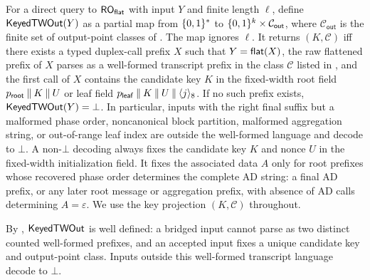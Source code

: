 \begin{definition}
\label{def:keyed-twout}
For a direct query to $\mathsf{RO}_{\mathsf{flat}}$ with input $Y$ and finite length
$\ell$, define $\mathsf{KeyedTWOut}(Y)$ as a partial map from $\{0,1\}^*$ to
$\{0,1\}^k \times \mathcal{C}_{\mathsf{out}}$, where $\mathcal{C}_{\mathsf{out}}$
is the finite set of output-point classes of . The map ignores
$\ell$. It returns $(K,\mathcal{C})$ iff
there exists a typed \TW{} duplex-call prefix $X$ such that
$Y = \mathsf{flat}(X)$, the raw flattened prefix of $X$ parses as a
well-formed \TW{} transcript prefix in the class $\mathcal{C}$ listed in
, and the first call of $X$ contains the
candidate key $K$ in the fixed-width root field
$p_{\mathsf{root}} \mathbin{\|} K \mathbin{\|} U$ or leaf field
$p_{\mathsf{leaf}} \mathbin{\|} K \mathbin{\|} U \mathbin{\|} \langle j \rangle_8$. If no
such prefix exists, $\mathsf{KeyedTWOut}(Y) = \bot$. In particular, inputs with
the right final suffix but a malformed phase order, noncanonical block
partition, malformed aggregation string, or out-of-range leaf index are
outside the well-formed language and decode to $\bot$. A non-$\bot$
decoding always fixes the candidate key $K$ and nonce $U$ in the
fixed-width initialization field. It fixes the associated data $A$ only
for root prefixes whose recovered phase order determines the complete AD
string: a final AD prefix, or any later root message or aggregation
prefix, with absence of AD calls determining $A=\varepsilon$. We use the
key projection $(K,\mathcal{C})$ throughout.
\end{definition}

By , $\mathsf{KeyedTWOut}$ is well
defined: a bridged input cannot parse as two distinct counted
well-formed prefixes, and an accepted input fixes a unique candidate key
and output-point class. Inputs outside this well-formed transcript
language decode to $\bot$.

